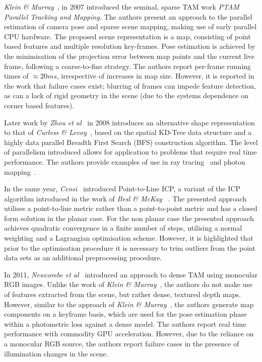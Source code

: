 \textit{Klein \& Murray}~\cite{Klein2007}, in 2007 introduced the seminal, sparse TAM work 
\textit{PTAM\: Parallel Tracking and Mapping}. The authors present an approach to the parallel 
estimation of camera pose and sparse scene mapping, making use of early parallel CPU hardware. 
The proposed scene representation is a map, consisting of point based features and multiple resolution 
key-frames. Pose estimation is achieved by the minimisation of the projection error between map points and 
the current live frame, following a coarse-to-fine strategy. The authors report per-frame running times of 
\( \approx 20ms \), irrespective of increases in map size. However, it is reported in the work that failure 
cases exist; blurring of frames can impede feature detection, as can a lack of rigid geometry in the scene (due 
to the systems dependence on corner based features).

Later work by \textit{Zhou et al}~\cite{Zhou2008} in 2008 introduces an alternative 
shape representation to that of \textit{Curless \& Levoy}~\cite{Curless1996}, based 
on the spatial KD-Tree data structure and a highly data parallel Breadth First 
Search (BFS) construction algorithm. The level of parallelism introduced allows for 
application to problems that require real time performance. The authors provide 
examples of use in ray tracing~\cite{Purcell2002} and photon mapping~\cite{Kajiya1986}.

In the same year, \textit{Censi}~\cite{Censi2008} introduced Point-to-Line ICP, a 
variant of the ICP algorithm introduced in the work of \textit{Besl \& McKay} 
~\cite{Besl1992}. The presented approach utilises a point-to-line metric rather than 
a point-to-point metric and has a closed form solution in the planar case. For the non 
planar case the presented approach achieves quadratic convergence in a finite number of 
steps, utilising a normal weighting and a Lagrangian optimisation scheme. However, it is 
highlighted that prior to the optimisation procedure it is necessary to trim outliers 
from the point data sets as an additional preprocessing procedure.

In 2011, \textit{Newcombe et al}~\cite{Newcombe2011_2} introduced an approach to dense TAM 
using monocular RGB images. Unlike the work of \textit{Klein \& Murray}~\cite{Klein2007}, the 
authors do not make use of features extracted from the scene, but rather dense, textured depth 
maps. However, similar to the approach of \textit{Klein \& Murray}~\cite{Klein2007}, the authors 
generate map components on a keyframe basis, which are used for the pose estimation phase within 
a photometric loss against a dense model. The authors report real time performance with commodity 
GPU acceleration. However, due to the reliance on a monocular RGB source, the authors report failure 
cases in the presence of illumination changes in the scene.

